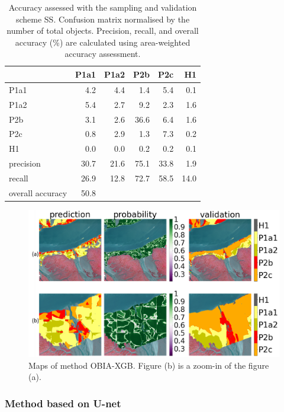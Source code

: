 \documentclass{isprs} %
\begin{document}
\begin{table}[]
    \centering
    
\begin{tabular}{lrrrrr}
\toprule
{} &  P1a1 &  P1a2 &  P2b &  P2c &   H1 \\
\midrule
P1a1             &   4.2 &   4.4 &  1.4 &  5.4 &  0.1 \\
P1a2             &   5.4 &   2.7 &  9.2 &  2.3 &  1.6 \\
P2b              &   3.1 &   2.6 & 36.6 &  6.4 &  1.6 \\
P2c              &   0.8 &   2.9 &  1.3 &  7.3 &  0.2 \\
H1               &   0.0 &   0.0 &  0.2 &  0.2 &  0.1 \\
precision        &  30.7 &  21.6 & 75.1 & 33.8 &  1.9 \\
recall           &  26.9 &  12.8 & 72.7 & 58.5 & 14.0 \\
overall accuracy &  50.8 &       &      &      &      \\
\bottomrule
\end{tabular}
    \caption{Accuracy assessed with the sampling and validation scheme SS. Confusion matrix normalised by the number of total objects. Precision, recall, and overall accuracy (\%) are calculated using area-weighted accuracy assessment.}
    \label{xgb_ss}
\end{table}


 \begin{figure}[!h]
    \centering
    \includegraphics[width=\linewidth]{figures/prediction_westerscheldt_merged.png}
    \caption{Maps of method OBIA-XGB. Figure (b) is a zoom-in of the figure (a).}
    \label{fig:spxgb}
\end{figure}

\subsubsection{Method based on U-net}
\end{document}
